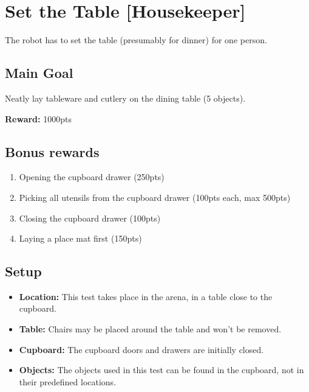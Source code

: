 \section{Set the Table [Housekeeper]}
\label{test:set-the-table}
The robot has to set the table (presumably for dinner) for one person.


\subsection*{Main Goal}
Neatly lay tableware and cutlery on the dining table (5 objects).

\noindent\textbf{Reward:} 1000pts

\subsection*{Bonus rewards}
\begin{enumerate}[nosep]
	\item Opening the cupboard drawer (250pts)
	\item Picking all utensils from the cupboard drawer (100pts each, max 500pts)
	\item Closing the cupboard drawer (100pts)
	\item Laying a place mat first (150pts)
\end{enumerate}

\subsection*{Setup}
\begin{itemize}[nosep]
	\item \textbf{Location:} This test takes place in the arena, in a table close to the cupboard.
	\item \textbf{Table:} Chairs may be placed around the table and won't be removed.
	\item \textbf{Cupboard:} The cupboard doors and drawers are initially closed.
	\item \textbf{Objects:} The objects used in this test can be found in the cupboard, not in their predefined locations.
\end{itemize}


